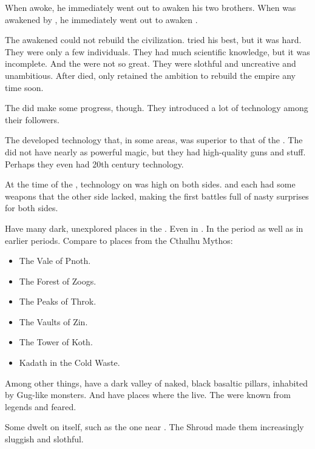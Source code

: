 When \Nexagglachel awoke, he immediately went out to awaken his two brothers.
When \Ishnaruchaefir was awakened by \Nexagglachel, he immediately went out to awaken \Rystessakhin. 

The awakened \dragons could not rebuild the \ophidian civilization. 
\Nexagglachel tried his best, but it was hard. 
They were only a few individuals.
They had much scientific knowledge, but it was incomplete.
And the \quiljaaran were not so great. 
They were slothful and uncreative and unambitious.
After \Nexagglachel died, only \Secherdamon retained the ambition to rebuild the \ophidian empire any time soon. 

The \dragons did make some progress, though. 
They introduced a lot of technology among their followers.

The \aryothim developed technology that, in some areas, was superior to that of the \quiljaaran. 
The \aryothim did not have nearly as powerful magic, but they had high-quality guns and stuff.
Perhaps they even had 20th century technology. 

At the time of the \secondbanewar, technology on \Miith was high on both sides. 
\Miithians and \resphain each had some weapons that the other side lacked, making the first battles full of nasty surprises for both sides. 



Have many dark, unexplored  places in the \wylde. 
Even in \Velcad. 
In the \thirdbanewar period as well as in earlier periods. 
Compare to places from the Cthulhu Mythos:
\begin{itemize}
  \item The Vale of Pnoth.
  \item The Forest of Zoogs.
  \item The Peaks of Throk.
  \item The Vaults of Zin.
  \item The Tower of Koth. 
  \item Kadath in the Cold Waste.
\end{itemize}
Among other things, have a dark valley of naked, black basaltic pillars, inhabited by Gug-like monsters. 
And have places where the \quiljaaran live. 
The \serpentmen were known from legends and feared. 



Some \xss dwelt on \Miith itself, such as the one near \Yormis.
The Shroud made them increasingly sluggish and slothful. 



